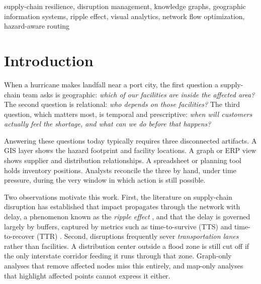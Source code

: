 \documentclass[conference]{IEEEtran}
\begin{document}
\begin{IEEEkeywords}
supply-chain resilience, disruption management, knowledge graphs,
geographic information systems, ripple effect, visual analytics,
network flow optimization, hazard-aware routing
\end{IEEEkeywords}

\section{Introduction}
When a hurricane makes landfall near a port city, the first question a
supply-chain team asks is geographic: \emph{which of our facilities are
inside the affected area?} The second question is relational:
\emph{who depends on those facilities?} The third question, which matters
most, is temporal and prescriptive: \emph{when will customers actually
feel the shortage, and what can we do before that happens?}

Answering these questions today typically requires three disconnected
artifacts. A GIS layer shows the hazard footprint and facility
locations. A graph or ERP view shows supplier and distribution
relationships. A spreadsheet or planning tool holds inventory positions.
Analysts reconcile the three by hand, under time pressure, during the
very window in which action is still possible.

Two observations motivate this work. First, the literature on
supply-chain disruption has established that impact propagates through
the network with delay, a phenomenon known as the \emph{ripple effect}
\cite{ivanov2017ripple,dolgui2018ripple}, and that the delay is governed
largely by buffers, captured by metrics such as time-to-survive (TTS) and
time-to-recover (TTR) \cite{simchilevi2014,simchilevi2015}. Second,
disruptions frequently sever \emph{transportation lanes} rather than
facilities. A distribution center outside a flood zone is still cut off
if the only interstate corridor feeding it runs through that zone.
Graph-only analyses that remove affected nodes miss this entirely, and
map-only analyses that highlight affected points cannot express it
either.
\end{document}
